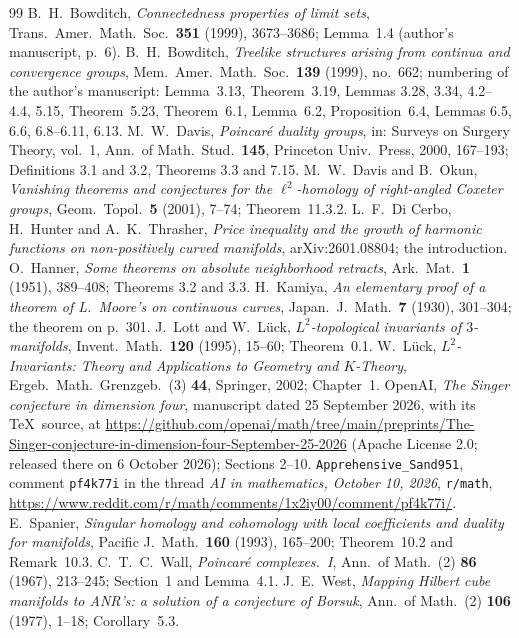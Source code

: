 \documentclass[11pt,a4paper]{article}
\theoremstyle{definition}
\theoremstyle{remark}
\begin{document}
\begin{thebibliography}{99}
 B.~H.~Bowditch, \emph{Connectedness properties of limit sets},
Trans.\ Amer.\ Math.\ Soc.\ \textbf{351} (1999), 3673--3686; Lemma~1.4 (author's
manuscript, p.~6).
 B.~H.~Bowditch, \emph{Treelike structures arising from continua and
convergence groups}, Mem.\ Amer.\ Math.\ Soc.\ \textbf{139} (1999), no.~662;
numbering of the author's manuscript: Lemma~3.13, Theorem~3.19, Lemmas 3.28, 3.34,
4.2--4.4, 5.15, Theorem~5.23, Theorem~6.1, Lemma~6.2, Proposition~6.4,
Lemmas 6.5, 6.6, 6.8--6.11, 6.13.
 M.~W.~Davis, \emph{Poincar\'e duality groups}, in: Surveys on Surgery
Theory, vol.~1, Ann.\ of Math.\ Stud.\ \textbf{145}, Princeton Univ.\ Press, 2000,
167--193; Definitions 3.1 and 3.2, Theorems 3.3 and 7.15.
 M.~W.~Davis and B.~Okun, \emph{Vanishing theorems and conjectures for
the $\ell^2$-homology of right-angled Coxeter groups}, Geom.\ Topol.\ \textbf{5}
(2001), 7--74; Theorem~11.3.2.
 L.~F.~Di Cerbo, H.~Hunter and A.~K.~Thrasher, \emph{Price inequality
and the growth of harmonic functions on non-positively curved manifolds},
arXiv:2601.08804; the introduction.
 O.~Hanner, \emph{Some theorems on absolute neighborhood retracts},
Ark.\ Mat.\ \textbf{1} (1951), 389--408; Theorems 3.2 and 3.3.
 H.~Kamiya, \emph{An elementary proof of a theorem of L.~Moore's on
continuous curves}, Japan.\ J.\ Math.\ \textbf{7} (1930), 301--304; the theorem on
p.~301.
 J.~Lott and W.~L\"uck, \emph{$L^2$-topological invariants of
$3$-manifolds}, Invent.\ Math.\ \textbf{120} (1995), 15--60; Theorem~0.1.
 W.~L\"uck, \emph{$L^2$-Invariants: Theory and Applications to Geometry
and $K$-Theory}, Ergeb.\ Math.\ Grenzgeb.\ (3) \textbf{44}, Springer, 2002; Chapter~1.
 OpenAI, \emph{The Singer conjecture in dimension four}, manuscript
dated 25 September 2026, with its \TeX\ source, at
\url{https://github.com/openai/math/tree/main/preprints/The-Singer-conjecture-in-dimension-four-September-25-2026}
(Apache License 2.0; released there on 6 October 2026); Sections 2--10.
 \texttt{Apprehensive\_Sand951}, comment \texttt{pf4k77i} in the thread
\emph{AI in mathematics, October 10, 2026}, \texttt{r/math},
\url{https://www.reddit.com/r/math/comments/1x2iy00/comment/pf4k77i/}.
 E.~Spanier, \emph{Singular homology and cohomology with local
coefficients and duality for manifolds}, Pacific J.\ Math.\ \textbf{160} (1993),
165--200; Theorem~10.2 and Remark~10.3.
 C.~T.~C.~Wall, \emph{Poincar\'e complexes.~I}, Ann.\ of Math.\ (2)
\textbf{86} (1967), 213--245; Section~1 and Lemma~4.1.
 J.~E.~West, \emph{Mapping Hilbert cube manifolds to ANR's: a solution
of a conjecture of Borsuk}, Ann.\ of Math.\ (2) \textbf{106} (1977), 1--18;
Corollary~5.3.
\end{thebibliography}
\end{document}
